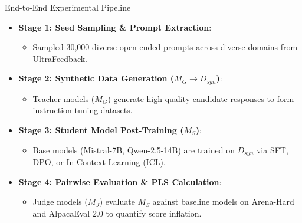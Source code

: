\documentclass[10pt]{beamer}
\begin{document}
	\begin{frame}{End-to-End Experimental Pipeline}
		\begin{itemize}
			\item \textbf{Stage 1: Seed Sampling \& Prompt Extraction}:
			\begin{itemize}
				\item Sampled 30,000 diverse open-ended prompts across diverse domains from UltraFeedback.
			\end{itemize}
			\item \textbf{Stage 2: Synthetic Data Generation ($M_G \rightarrow D_{syn}$)}:
			\begin{itemize}
				\item Teacher models ($M_G$) generate high-quality candidate responses to form instruction-tuning datasets.
			\end{itemize}
			\item \textbf{Stage 3: Student Model Post-Training ($M_S$)}:
			\begin{itemize}
				\item Base models (Mistral-7B, Qwen-2.5-14B) are trained on $D_{syn}$ via SFT, DPO, or In-Context Learning (ICL).
			\end{itemize}
			\item \textbf{Stage 4: Pairwise Evaluation \& PLS Calculation}:
			\begin{itemize}
				\item Judge models ($M_J$) evaluate $M_S$ against baseline models on Arena-Hard and AlpacaEval 2.0 to quantify score inflation.
			\end{itemize}
		\end{itemize}
	\end{frame}
	
\end{document}
